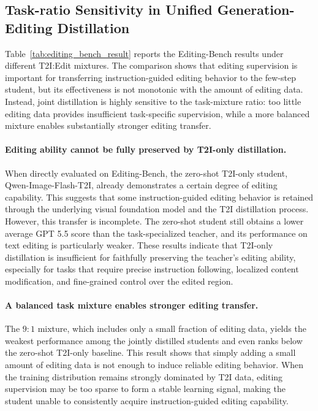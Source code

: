 \documentclass{llmxive}
\begin{document}
\subsection{Task-ratio Sensitivity in Unified Generation-Editing Distillation}


Table~\ref{tab:editing_bench_result} reports the Editing-Bench results under different T2I:Edit mixtures. The comparison shows that editing supervision is important for transferring instruction-guided editing behavior to the few-step student, but its effectiveness is not monotonic with the amount of editing data. Instead, joint distillation is highly sensitive to the task-mixture ratio: too little editing data provides insufficient task-specific supervision, while a more balanced mixture enables substantially stronger editing transfer.

\paragraph{Editing ability cannot be fully preserved by T2I-only distillation.}
When directly evaluated on Editing-Bench, the zero-shot T2I-only student, Qwen-Image-Flash-T2I, already demonstrates a certain degree of editing capability. This suggests that some instruction-guided editing behavior is retained through the underlying visual foundation model and the T2I distillation process. However, this transfer is incomplete. The zero-shot student still obtains a lower average GPT 5.5 score than the task-specialized teacher, and its performance on text editing is particularly weaker. These results indicate that T2I-only distillation is insufficient for faithfully preserving the teacher's editing ability, especially for tasks that require precise instruction following, localized content modification, and fine-grained control over the edited region.

\paragraph{A balanced task mixture enables stronger editing transfer.}
The $9{:}1$ mixture, which includes only a small fraction of editing data, yields the weakest performance among the jointly distilled students and even ranks below the zero-shot T2I-only baseline. This result shows that simply adding a small amount of editing data is not enough to induce reliable editing behavior. When the training distribution remains strongly dominated by T2I data, editing supervision may be too sparse to form a stable learning signal, making the student unable to consistently acquire instruction-guided editing capability.
\end{document}
